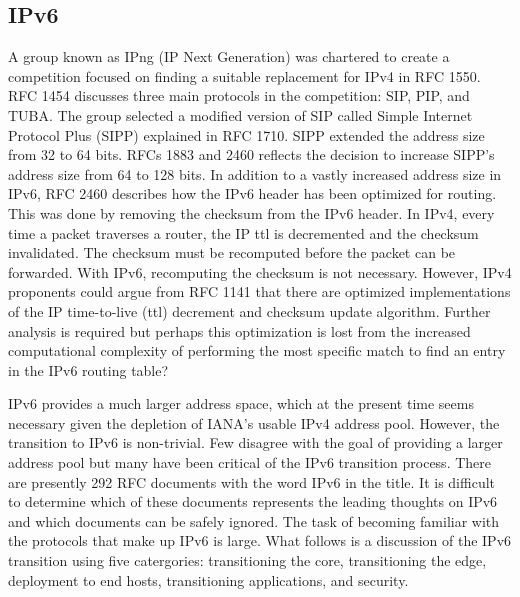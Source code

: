 \subsection{IPv6}
A group known as IPng (IP Next Generation) was chartered to
create a competition focused on finding a suitable replacement
for IPv4 in RFC 1550.  RFC 1454 discusses three main protocols in the
competition: SIP, PIP, and TUBA.  The group selected
a modified version of SIP called Simple Internet Protocol Plus
(SIPP) explained in RFC 1710.  SIPP extended the address size from 32 to
64 bits.  RFCs 1883 and 2460 reflects the decision
to increase SIPP's address size from
64 to 128 bits.  In addition to a vastly
increased address size in IPv6, RFC 2460 describes how
the IPv6 header has been optimized
for routing.  This was done by removing the checksum
from the IPv6 header.  In IPv4, every time a packet traverses a
router, the IP ttl is decremented and the checksum invalidated.
The checksum must be recomputed before the packet can be forwarded.
With IPv6, recomputing the checksum is not necessary.  However,
IPv4 proponents could argue from RFC 1141 that
there are optimized implementations of
the IP time-to-live (ttl) decrement and checksum update algorithm.
Further analysis is required but perhaps this optimization is lost
from the increased computational complexity of performing the most
specific match to find an entry in the IPv6 routing table?

IPv6 provides a much larger address space, which at the
present time seems necessary given the depletion of IANA's
usable IPv4 address pool.  However, the transition to IPv6 is
non-trivial.  Few disagree with the goal of providing a larger
address pool but many have been critical of the IPv6 transition
process\cite{Cpe01,ipv6mess}.  There are
presently 292 RFC documents with the word IPv6 in the title.  It is
difficult to determine which of these documents represents the
leading thoughts on IPv6 and which documents can be safely ignored.
The task of becoming familiar with the protocols that make up IPv6
is large.   What follows is a discussion of the IPv6 transition using
five catergories: transitioning the core, transitioning the edge,
deployment to end hosts, transitioning applications, and security.

